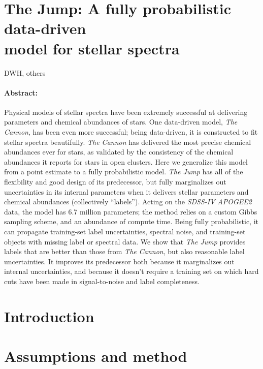 \documentclass[12pt, letterpaper]{article}
\newcommand{\project}[1]{\textsl{{#1}}}
\newcommand{\acronym}[1]{{\small{#1}}}
\begin{document}
\section*{The Jump: A fully probabilistic data-driven \\
model for stellar spectra}

\noindent
DWH, others

\paragraph{Abstract:}
Physical models of stellar spectra have been extremely successful
at delivering parameters and chemical abundances of stars.
One data-driven model, \project{The Cannon}, has been even more
successful; being data-driven, it is constructed to fit stellar
spectra beautifully.
\project{The Cannon} has delivered the most precise chemical abundances ever for
stars, as validated by the consistency of the chemical abundances
it reports for stars in open clusters.
Here we generalize this model from a point estimate to a fully
probabilistic model.
\project{The Jump} has all of the flexibility and good design of
its predecessor, but fully marginalizes out uncertainties in its
internal parameters when it delivers stellar parameters and
chemical abundances (collectively ``labels'').
Acting on the \project{\acronym{SDSS-IV}} \project{\acronym{APOGEE2}} data, the model
has 6.7 million parameters; the method relies on a custom Gibbs sampling
scheme, and an abundance of compute time.
Being fully probabilistic, it can propagate training-set label uncertainties,
spectral noise, and training-set objects with missing label or spectral data.
We show that \project{The Jump} provides labels that are better than those
from \project{The Cannon}, but also reasonable label uncertainties.
It improves its predecessor both because it marginalizes out internal
uncertainties, and because it doesn't require a training set on which
hard cuts have been made in signal-to-noise and label completeness.

\section{Introduction}

\section{Assumptions and method}
\end{document}
